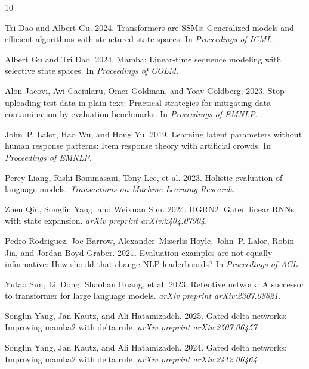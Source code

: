 \documentclass[11pt,a4paper]{article}
\begin{document}
\begin{thebibliography}{10}

Tri Dao and Albert Gu. 2024.
\newblock Transformers are SSMs: Generalized models and efficient algorithms with structured state spaces.
\newblock In \emph{Proceedings of ICML}.

Albert Gu and Tri Dao. 2024.
\newblock Mamba: Linear-time sequence modeling with selective state spaces.
\newblock In \emph{Proceedings of COLM}.

Alon Jacovi, Avi Caciularu, Omer Goldman, and Yoav Goldberg. 2023.
\newblock Stop uploading test data in plain text: Practical strategies for mitigating data contamination by evaluation benchmarks.
\newblock In \emph{Proceedings of EMNLP}.

John~P. Lalor, Hao Wu, and Hong Yu. 2019.
\newblock Learning latent parameters without human response patterns: Item response theory with artificial crowds.
\newblock In \emph{Proceedings of EMNLP}.

Percy Liang, Rishi Bommasani, Tony Lee, et al. 2023.
\newblock Holistic evaluation of language models.
\newblock \emph{Transactions on Machine Learning Research}.

Zhen Qin, Songlin Yang, and Weixuan Sun. 2024.
\newblock HGRN2: Gated linear RNNs with state expansion.
\newblock \emph{arXiv preprint arXiv:2404.07904}.

Pedro Rodriguez, Joe Barrow, Alexander~Miserlis Hoyle, John~P. Lalor, Robin Jia, and Jordan Boyd-Graber. 2021.
\newblock Evaluation examples are not equally informative: How should that change NLP leaderboards?
\newblock In \emph{Proceedings of ACL}.

Yutao Sun, Li~Dong, Shaohan Huang, et al. 2023.
\newblock Retentive network: A successor to transformer for large language models.
\newblock \emph{arXiv preprint arXiv:2307.08621}.

Songlin Yang, Jan Kautz, and Ali Hatamizadeh. 2025.
\newblock Gated delta networks: Improving mamba2 with delta rule.
\newblock \emph{arXiv preprint arXiv:2507.06457}.

Songlin Yang, Jan Kautz, and Ali Hatamizadeh. 2024.
\newblock Gated delta networks: Improving mamba2 with delta rule.
\newblock \emph{arXiv preprint arXiv:2412.06464}.

\end{thebibliography}
\end{document}
